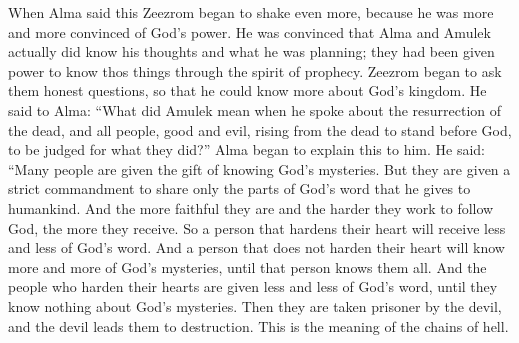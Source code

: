 When Alma said this Zeezrom began to shake even more, because he was more and more convinced of God's power. He was convinced that Alma and Amulek actually did know his thoughts and what he was planning; they had been given power to know thos things through the spirit of prophecy.
\bverse \iffalse And Zeezrom began to inquire of them diligently, that he might know more concerning the kingdom of God. And he said unto Alma: What does this mean which Amulek hath spoken concerning the resurrection of the dead, that all shall rise from the dead, both the just and the unjust, and are brought to stand before God to be judged according to their works? \fi
Zeezrom began to ask them honest questions, so that he could know more about God's kingdom. He said to Alma: ``What did Amulek mean when he spoke about the resurrection of the dead, and all people, good and evil, rising from the dead to stand before God, to be judged for what they did?''
\bverse \iffalse And now Alma began to expound these things unto him, saying: It is given unto many to know the mysteries of God; nevertheless they are laid under a strict command that they shall not impart only according to the portion of his word which he doth grant unto the children of men, according to the heed and diligence which they give unto him. \fi
Alma began to explain this to him. He said: ``Many people are given the gift of knowing God's mysteries. But they are given a strict commandment to share only the parts of God's word that he gives to humankind. And the more faithful they are and the harder they work to follow God, the more they receive.
\bverse \iffalse And therefore, he that will harden his heart, the same receiveth the lesser portion of the word; and he that will not harden his heart, to him is given the greater portion of the word, until it is given unto him to know the mysteries of God until he know them in full. \fi
So a person that hardens their heart will receive less and less of God's word. And a person that does not harden their heart will know more and more of God's mysteries, until that person knows them all.
\bverse \iffalse And they that will harden their hearts, to them is given the lesser portion of the word until they know nothing concerning his mysteries; and then they are taken captive by the devil, and led by his will down to destruction. Now this is what is meant by the chains of hell. \fi
And the people who harden their hearts are given less and less of God's word, until they know nothing about God's mysteries. Then they are taken prisoner by the devil, and the devil leads them to destruction. This is the meaning of the chains of hell.
